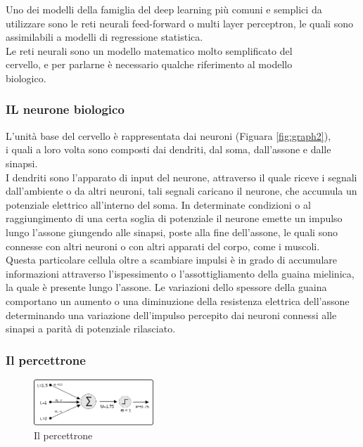 \documentclass[10pt,a4paper]{article}
\begin{document}
Uno dei modelli della famiglia del deep learning più comuni e semplici da utilizzare sono le reti neurali feed-forward o multi layer perceptron, le quali sono assimilabili a modelli di regressione statistica.\\
Le reti neurali sono un modello matematico molto semplificato del\\ cervello, e per parlarne è necessario qualche riferimento al modello \\biologico.

\subsubsection*{IL neurone biologico}
L'unità base del cervello è rappresentata dai neuroni (Figuara \ref{fig:graph2}),\\ i quali a loro volta sono composti dai dendriti, dal soma, dall'assone e dalle sinapsi. 
\\I dendriti sono l'apparato di input del neurone, attraverso il quale riceve i segnali dall'ambiente o da altri neuroni, tali segnali caricano il neurone, che accumula un potenziale elettrico all'interno del soma.
In determinate condizioni o al raggiungimento di una certa soglia di potenziale il neurone emette un impulso lungo l'assone giungendo alle sinapsi, poste alla fine dell'assone, le quali sono connesse con altri neuroni o con altri apparati del corpo, come i muscoli.\\
Questa particolare cellula oltre a scambiare impulsi è in grado di accumulare informazioni attraverso l'ispessimento o l'assottigliamento della guaina mielinica, la quale è presente lungo l'assone.
Le variazioni dello spessore della guaina comportano un aumento o una diminuzione della resistenza elettrica dell'assone determinando una variazione dell'impulso percepito dai neuroni connessi alle sinapsi a parità di potenziale rilasciato.   

\newpage

\subsubsection*{Il percettrone} 

\begin{figure}
	\centering
	\vspace{-15pt}
    \includegraphics[width=0.4\textwidth]{percettrone.png}
  	\caption{Il percettrone}
  	\label{fig:graph3}
\end{figure}
\end{document}
